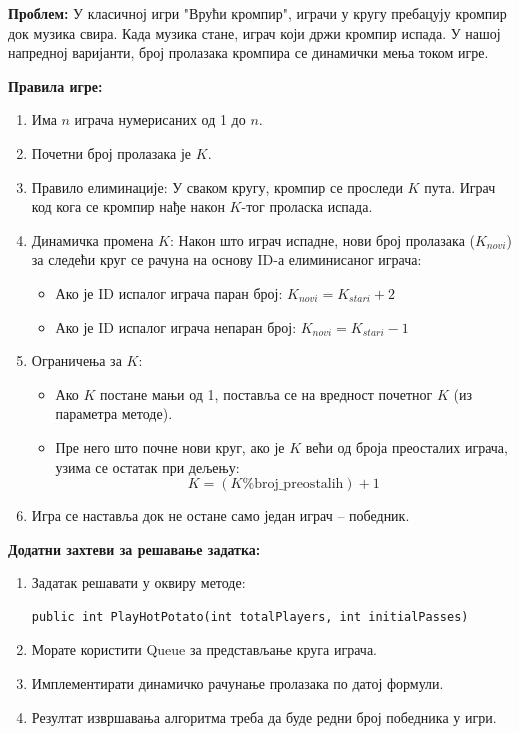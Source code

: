 \textbf{Проблем:} У класичној игри "Врући кромпир", играчи у кругу пребацују кромпир док музика свира. Када музика стане, играч који држи кромпир испада. У нашој напредној варијанти, број пролазака кромпира се динамички мења током игре.

\textbf{Правила игре:}
\begin{enumerate}
	\item Има $n$ играча нумерисаних од 1 до $n$.
	\item Почетни број пролазака је $K$.
	\item Правило елиминације: У сваком кругу, кромпир се проследи $K$ пута. Играч код кога се кромпир нађе након $K$-тог проласка испада.
	\item Динамичка промена $K$: Након што играч испадне, нови број пролазака ($K_{novi}$) за следећи круг се рачуна на основу ID-а елиминисаног играча:
	\begin{itemize}
		\item Ако је ID испалог играча паран број: $K_{novi} = K_{stari} + 2$
		\item Ако је ID испалог играча непаран број: $K_{novi} = K_{stari} - 1$
	\end{itemize}
	\item Ограничења за $K$:
	\begin{itemize}
		\item Ако $K$ постане мањи од 1, поставља се на вредност почетног $K$ (из параметра методе).
		\item Пре него што почне нови круг, ако је $K$ већи од броја преосталих играча, узима се остатак при дељењу:
		$$
		K = (K \% \text{broj\_preostalih}) + 1
		$$
	\end{itemize}
	\item Игра се наставља док не остане само један играч -- победник.
\end{enumerate}

\textbf{Додатни захтеви за решавање задатка:}
\begin{enumerate}
	\item Задатак решавати у оквиру методе:
	\begin{Verbatim}[fontsize=\small]
public int PlayHotPotato(int totalPlayers, int initialPasses)
	\end{Verbatim}
	\item Морате користити Queue за представљање круга играча.
	\item Имплементирати динамичко рачунање пролазака по датој формули.
	\item Резултат извршавања алгоритма треба да буде редни број победника у игри.
\end{enumerate}

